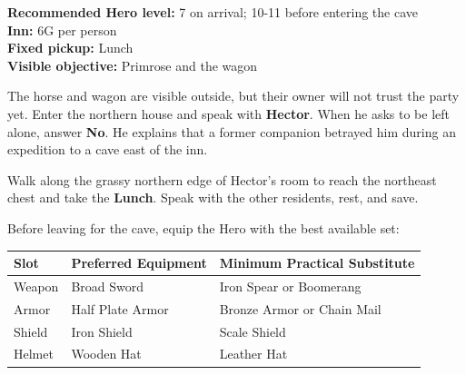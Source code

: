 \documentclass[
  american,
  10pt,
  letterpaper,
  oneside,
  open=any]{scrreprt}
\newcounter{none} %
\newenvironment{guidetable}{%
  \small\setstretch{1.0}%
  \setlength{\tabcolsep}{4pt}%
  \setlength{\LTpre}{8pt}\setlength{\LTpost}{10pt}%
  \renewcommand{\arraystretch}{1.16}%
}{ }
\begin{document}
\textbf{Recommended Hero level:} 7 on arrival; 10-11 before entering the
cave\\
\textbf{Inn:} 6G per person\\
\textbf{Fixed pickup:} Lunch\\
\textbf{Visible objective:} Primrose and the wagon

The horse and wagon are visible outside, but their owner will not trust
the party yet. Enter the northern house and speak with \textbf{Hector}.
When he asks to be left alone, answer \textbf{No}. He explains that a
former companion betrayed him during an expedition to a cave east of the
inn.

Walk along the grassy northern edge of Hector's room to reach the
northeast chest and take the \textbf{Lunch}. Speak with the other
residents, rest, and save.

Before leaving for the cave, equip the Hero with the best available set:

\begin{guidetable}

{\def\LTcaptype{none} %
\begin{longtable}[]{@{}
  >{\raggedright\arraybackslash}p{}
  >{\raggedright\arraybackslash}p{}
  >{\raggedright\arraybackslash}p{}@{}}
\toprule\noalign{}
\begin{minipage}[b]{\linewidth}\raggedright
\color{GuideGreen}\bfseries Slot
\end{minipage} & \begin{minipage}[b]{\linewidth}\raggedright
\color{GuideGreen}\bfseries Preferred Equipment
\end{minipage} & \begin{minipage}[b]{\linewidth}\raggedright
\color{GuideGreen}\bfseries Minimum Practical Substitute
\end{minipage} \\
\midrule\noalign{}
\endhead
\bottomrule\noalign{}
\endlastfoot
Weapon & Broad Sword & Iron Spear or Boomerang \\
Armor & Half Plate Armor & Bronze Armor or Chain Mail \\
Shield & Iron Shield & Scale Shield \\
Helmet & Wooden Hat & Leather Hat \\
\end{longtable}
}

\end{guidetable}
\end{document}
